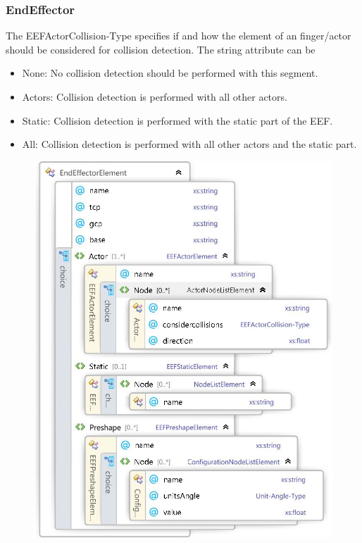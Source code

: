\documentclass{book}
\begin{document}
\subsubsection{EndEffector}
The EEFActorCollision-Type specifies if and how the element of an finger/actor should be considered for collision detection. The string attribute can be 
\begin{itemize}
\item None: No collision detection should be performed with this segment. 
\item Actors: Collision detection is performed with all other actors. 
\item Static: Collision detection is performed with the static part of the EEF. 
\item All: Collision detection is performed with all other actors and the static part. 
\end{itemize}
\begin{figure}[H]
	\centering
	\includegraphics[scale = 0.3]{Xsd_EEF_open}
\end{figure}
\end{document}
